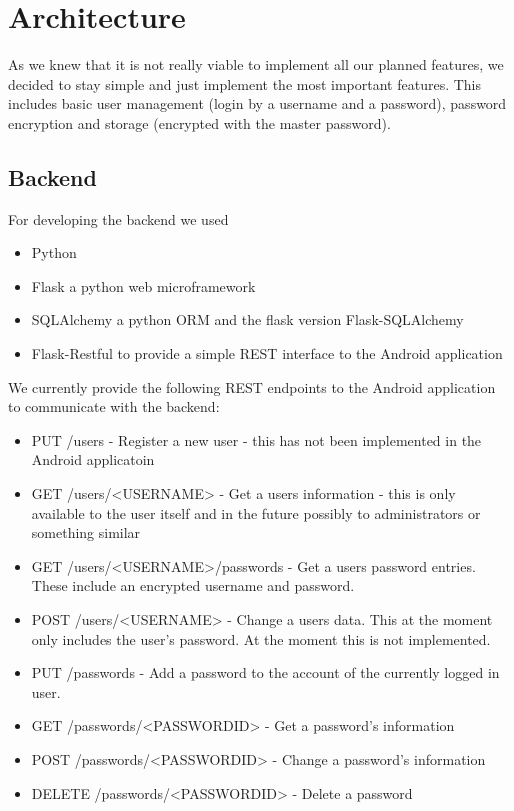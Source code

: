 \documentclass{report}
\begin{document}
\section{Architecture}

As we knew that it is not really viable to implement all our planned features, we decided to stay simple and just implement the most important features. This includes basic user management (login by a username and a password), password encryption and storage (encrypted with the master password).

\subsection{Backend}
For developing the backend we used
\begin{itemize}
	\item Python \cite{Python}
	\item Flask \cite{Flask} a python web microframework
	\item SQLAlchemy \cite{SQLAlchemy} a python ORM and the flask version Flask-SQLAlchemy \cite{FlaskSQLAlchemy}
	\item Flask-Restful \cite{Flask-Restful} to provide a simple REST interface to the Android application
\end{itemize}

We currently provide the following REST endpoints to the Android application to communicate with the backend:

\begin{itemize}
	\item PUT /users - Register a new user - this has not been implemented in the Android applicatoin
	\item GET /users/<USERNAME> - Get a users information - this is only available to the user itself and in the future possibly to administrators or something similar
	\item GET /users/<USERNAME>/passwords - Get a users password entries. These include an encrypted username and password.
	\item POST /users/<USERNAME> - Change a users data. This at the moment only includes the user's password. At the moment this is not implemented.
	\item PUT /passwords - Add a password to the account of the currently logged in user.
	\item GET /passwords/<PASSWORDID> - Get a password's information
	\item POST /passwords/<PASSWORDID> - Change a password's information
	\item DELETE /passwords/<PASSWORDID> - Delete a password
\end{itemize}
\end{document}
